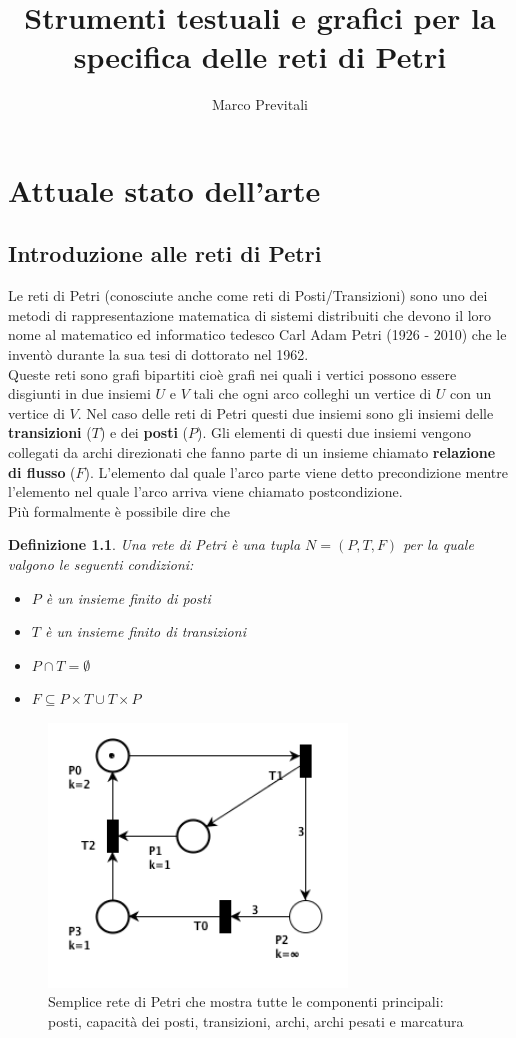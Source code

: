 \documentclass[italian,12pt]{book}
\title{Strumenti testuali e grafici per la specifica delle reti di
  Petri}
\author{Marco Previtali}
\date{}
\newtheorem{mydef}{Definizione}
\begin{document}
\maketitle
%
\tableofcontents
%
\chapter{Attuale stato dell'arte}\label{cha:stato_arte}
%
\section{Introduzione alle reti di Petri}
Le reti di Petri (conosciute anche come reti di Posti/Transizioni)
sono uno dei metodi di rappresentazione matematica di sistemi
distribuiti che devono il loro nome al matematico ed informatico
tedesco Carl Adam Petri (1926 - 2010)  che le inventò durante la sua
tesi di dottorato nel 1962. \\
Queste reti sono grafi bipartiti cioè grafi nei
quali i vertici possono essere disgiunti in due insiemi $U$ e $V$ tali
che ogni arco colleghi un vertice di $U$ con un vertice di $V$. Nel
caso delle reti di Petri questi due insiemi sono gli insiemi delle
{\bf transizioni} ($T$) e dei {\bf posti} ($P$). Gli elementi di
questi due insiemi vengono collegati da archi direzionati che fanno
parte di un insieme chiamato {\bf relazione di flusso}
($F$). L'elemento dal quale l'arco parte viene detto precondizione
mentre l'elemento nel quale l'arco arriva viene chiamato
postcondizione. \\
Più formalmente è possibile dire che 
\begin{mydef}\label{def:pn1}
Una rete di Petri è una tupla $N = (P, T, F)$ per la quale valgono le
seguenti condizioni:
\begin{itemize}
\item $P$ è un insieme finito di posti
\item $T$ è un insieme finito di transizioni
\item $P \cap T = \emptyset $
\item $F \subseteq P \times T \cup T \times P $
\end{itemize}
\end{mydef}

\begin{figure}[htb]
\centerline{\includegraphics[height=7cm]{img/pnetbase.png}}
\caption{Semplice rete di Petri che mostra tutte le componenti
  principali: posti, capacità dei posti, transizioni, archi, archi
  pesati e marcatura}\label{fig:pnetbase.png}
\end{figure}
\end{document}
